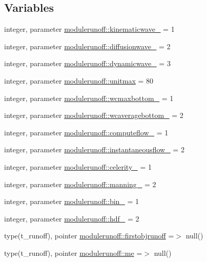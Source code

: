 \subsection*{Variables}
\begin{DoxyCompactItemize}
\item 
integer, parameter \mbox{\hyperlink{namespacemodulerunoff_a7d872d73b43557b544361b9b74e90035}{modulerunoff\+::kinematicwave\+\_\+}} = 1
\item 
integer, parameter \mbox{\hyperlink{namespacemodulerunoff_ac6fe68005bc73d532e27eb6517110958}{modulerunoff\+::diffusionwave\+\_\+}} = 2
\item 
integer, parameter \mbox{\hyperlink{namespacemodulerunoff_a39f0eb1cba53c8d2b5c35a2bf91527c3}{modulerunoff\+::dynamicwave\+\_\+}} = 3
\item 
integer, parameter \mbox{\hyperlink{namespacemodulerunoff_ac10e3a6d90722bfba74e163a0d843ca9}{modulerunoff\+::unitmax}} = 80
\item 
integer, parameter \mbox{\hyperlink{namespacemodulerunoff_a7146fc045f78f9a09c70cf5d2ec8cb18}{modulerunoff\+::wcmaxbottom\+\_\+}} = 1
\item 
integer, parameter \mbox{\hyperlink{namespacemodulerunoff_a11ce8a310aecc07c7ae3a6ebc63f67a3}{modulerunoff\+::wcaveragebottom\+\_\+}} = 2
\item 
integer, parameter \mbox{\hyperlink{namespacemodulerunoff_af9e2c2870eb941ba39e12c7eaf792f73}{modulerunoff\+::computeflow\+\_\+}} = 1
\item 
integer, parameter \mbox{\hyperlink{namespacemodulerunoff_afcb115128cbe159ab7b9ae036efd17e7}{modulerunoff\+::instantaneousflow\+\_\+}} = 2
\item 
integer, parameter \mbox{\hyperlink{namespacemodulerunoff_a908cc460c8fa4ad1b256592fc1ee6f7a}{modulerunoff\+::celerity\+\_\+}} = 1
\item 
integer, parameter \mbox{\hyperlink{namespacemodulerunoff_ab32f0149348946fb4056dcc3daad88b9}{modulerunoff\+::manning\+\_\+}} = 2
\item 
integer, parameter \mbox{\hyperlink{namespacemodulerunoff_aba178d18c17a2ba6f92129edba6fa3a2}{modulerunoff\+::bin\+\_\+}} = 1
\item 
integer, parameter \mbox{\hyperlink{namespacemodulerunoff_a513f6a75bd6e828db1c60af17f8017b4}{modulerunoff\+::hdf\+\_\+}} = 2
\item 
type(t\+\_\+runoff), pointer \mbox{\hyperlink{namespacemodulerunoff_abf39681d36c162ccb5230058a7271ef7}{modulerunoff\+::firstobjrunoff}} =$>$ null()
\item 
type(t\+\_\+runoff), pointer \mbox{\hyperlink{namespacemodulerunoff_a8cc2d0a24ef276099776dbfb529ab1bb}{modulerunoff\+::me}} =$>$ null()
\end{DoxyCompactItemize}
